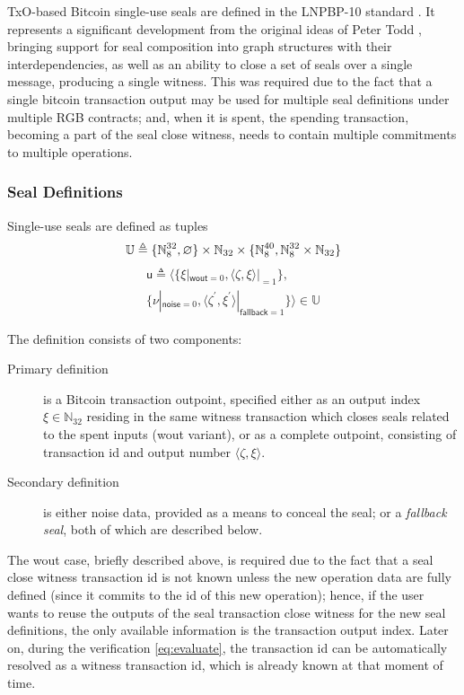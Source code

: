 \documentclass[9pt,oneside]{amsart}
\begin{document}
\begin{multicols}{2}
TxO-based Bitcoin single-use seals are defined in the LNPBP-10 standard \cite{LNPBP10}.
It represents a significant development from the original ideas of Peter Todd \cite{SUS1, SUS2},
bringing support for seal composition into graph structures with their interdependencies,
as well as an ability to close a set of seals over a single message, producing a single witness.
This was required due to the fact that a single bitcoin transaction output may be used
for multiple seal definitions under multiple RGB contracts;
and, when it is spent, the spending transaction, becoming a part of the seal close witness,
needs to contain multiple commitments to multiple operations.

\subsubsection{Seal Definitions}

Single-use seals are defined as tuples
\noindent
\begin{equation}
    \mathbb{U} \triangleq \{ \mathbb{N}_8^{32}, \varnothing \} \times \mathbb{N}_{32} \times \{ \mathbb{N}_8^{40}, \mathbb{N}_8^{32} \times \mathbb{N}_{32} \} \\
\end{equation}
\begin{multline}
    \mathsf{u} \triangleq \big\langle \{\xi|_{\mathsf{wout}=0}, \langle \zeta, \xi\rangle|_{=1} \}, \\
        \{\nu|_{\mathsf{noise}=0}, \langle \zeta^\prime, \xi^\prime\rangle|_{\mathsf{fallback}=1} \} \big\rangle \in \mathbb{U}
\end{multline}

The definition consists of two components:
\begin{description}
\item[Primary definition] is a Bitcoin transaction outpoint,
    specified either as an output index $\xi \in \mathbb{N}_{32}$
    residing in the same witness transaction which closes seals related to the spent inputs
    (\textsf{wout} variant), or as a complete outpoint,
    consisting of transaction id and output number $\langle \zeta, \xi\rangle$.
\item[Secondary definition] is either noise data, provided as a means to conceal the seal;
    or a \emph{fallback seal}, both of which are described below.
\end{description}

The \textsf{wout} case, briefly described above, is required due to the fact that
a seal close witness transaction id is not known unless the new operation data are fully defined
(since it commits to the id of this new operation);
hence, if the user wants to reuse the outputs of
the seal transaction close witness for the new seal definitions,
the only available information is the transaction output index.
Later on, during the verification \ref{eq:evaluate},
the transaction id can be automatically resolved
as a witness transaction id, which is already known at that moment of time.


\end{multicols}
\end{document}
